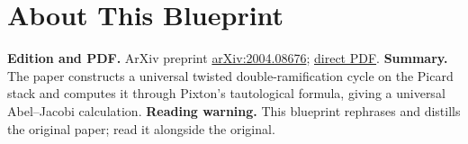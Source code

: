 

\chapter*{About This Blueprint}
\label{pixtons-formula-abel-jacobi-picard-stack-about}

\textbf{Edition and PDF.} ArXiv preprint \href{https://arxiv.org/abs/2004.08676}{arXiv:2004.08676};
\href{https://arxiv.org/pdf/2004.08676}{direct PDF}.
\textbf{Summary.} The paper constructs a universal twisted double-ramification cycle on the Picard stack and
computes it through Pixton's tautological formula, giving a universal Abel--Jacobi calculation.
\textbf{Reading warning.} This blueprint rephrases and distills the original paper; read it alongside the original.














